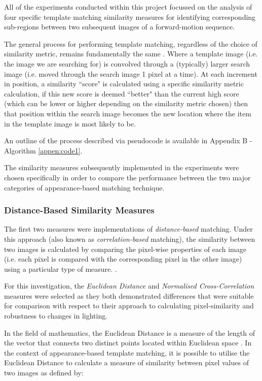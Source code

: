 All of the experiments conducted within this project focussed on the analysis of four specific template matching similarity measures for identifying corresponding sub-regions between two subsequent images of a forward-motion sequence.

The general process for performing template matching, regardless of the choice of similarity metric, remains fundamentally the same \cite{opencvtemplatematching}. Where a template image (i.e. the image we are searching for) is convolved through a (typically) larger search image (i.e. moved through the search image 1 pixel at a time). At each increment in position, a similarity ``score" is calculated using a specific similarity metric calculation, if this new score is deemed ``better" than the current high score (which can be lower or higher depending on the similarity metric chosen) then that position within the search image becomes the new location where the item in the template image is most likely to be.

An outline of the process described via pseudocode is available in Appendix B - Algorithm \ref{appen:code1}.

The similarity measures subsequently implemented in the experiments were chosen specifically in order to compare the performance between the two major categories of appearance-based matching technique. 

\subsubsection{Distance-Based Similarity Measures}

The first two measures were implementations of \textit{distance-based} matching. Under this approach (also known as \textit{correlation-based} matching), the similarity between two images is calculated by comparing the pixel-wise properties of each image (i.e. each pixel is compared with the corresponding pixel in the other image) using a particular type of measure. \cite{szeliski}. 

For this investigation, the \textit{Euclidean Distance} and \textit{Normalised Cross-Correlation} measures were selected as they both demonstrated differences that were suitable for comparison with respect to their approach to calculating pixel-similarity and robustness to changes in lighting. 

In the field of mathematics, the Euclidean Distance is a measure of the length of the vector that connects two distinct points located within Euclidean space \cite{szeliski}. In the context of appearance-based template matching, it is possible to utilise the Euclidean Distance to calculate a measure of similarity between pixel values of two images as defined by:

